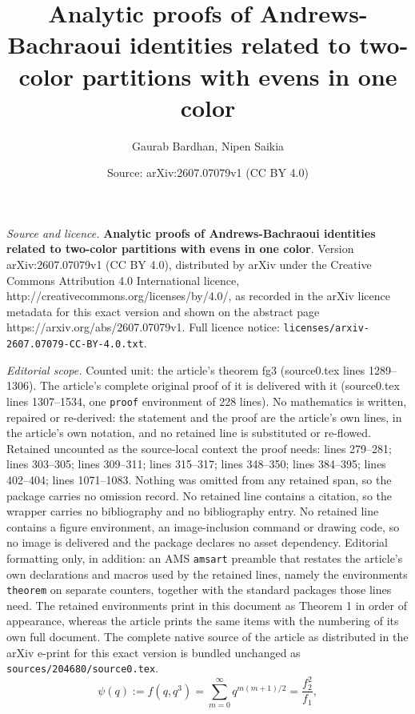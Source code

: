 \documentclass[10pt,a4paper]{amsart}
\title{\textbf{Analytic proofs of Andrews-Bachraoui identities related to two-color partitions with evens in one color}}
\author{Gaurab Bardhan, Nipen Saikia}
\date{Source: arXiv:2607.07079v1 (CC BY 4.0)}
\begin{document}
\maketitle

\noindent\emph{Source and licence.} \textbf{Analytic proofs of Andrews-Bachraoui identities related to two-color partitions with evens in one color}. Version arXiv:2607.07079v1 (CC BY 4.0), distributed by arXiv under the Creative Commons Attribution 4.0 International licence, http://creativecommons.org/licenses/by/4.0/, as recorded in the arXiv licence metadata for this exact version and shown on the abstract page https://arxiv.org/abs/2607.07079v1. Full licence notice: \texttt{licenses/arxiv-2607.07079-CC-BY-4.0.txt}.\par\smallskip

\noindent\textit{Editorial scope.} Counted unit: the article's theorem fg3 (source0.tex lines 1289--1306). The article's complete original proof of it is delivered with it (source0.tex lines 1307--1534, one \texttt{proof} environment of 228 lines). No mathematics is written, repaired or re-derived: the statement and the proof are the article's own lines, in the article's own notation, and no retained line is substituted or re-flowed.  Retained uncounted as the source-local context the proof needs: lines 279--281; lines 303--305; lines 309--311; lines 315--317; lines 348--350; lines 384--395; lines 402--404; lines 1071--1083.  Nothing was omitted from any retained span, so the package carries no omission record.  No retained line contains a citation, so the wrapper carries no bibliography and no bibliography entry.  No retained line contains a figure environment, an image-inclusion command or drawing code, so no image is delivered and the package declares no asset dependency.  Editorial formatting only, in addition: an AMS \texttt{amsart} preamble that restates the article's own declarations and macros used by the retained lines, namely the environments \texttt{theorem} on separate counters, together with the standard packages those lines need.  The retained environments print in this document as Theorem 1 in order of appearance, whereas the article prints the same items with the numbering of its own full document.  The complete native source of the article as distributed in the arXiv e-print for this exact version is bundled unchanged as \texttt{sources/204680/source0.tex}.
\begin{equation}\label{psi}
    \psi(q) := f(q, q^3) = \sum_{m=0}^{\infty} q^{m(m+1)/2} = \dfrac{f_2^2}{f_1},
\end{equation}
\end{document}
